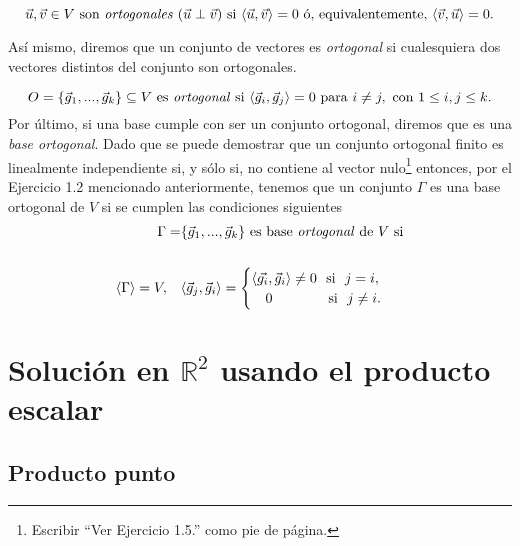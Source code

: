 \documentclass[12pt,dvipsnames]{article}
\numberwithin{equation}{section}
\begin{document}
\[
    \vec{u},\vec{v}\in V \ \text{son \emph{ortogonales}} \ (\vec{u}\perp\vec{v}) \ \text{si} \ \langle \vec{u} , \vec{v} \rangle = 0 \ \text{ó, equivalentemente,} \ \langle \vec{v} , \vec{u} \rangle = 0.
\] 

\noindent Así mismo, diremos que un conjunto de vectores es \emph{ortogonal} si cualesquiera dos vectores distintos del conjunto son ortogonales.

\[
    O=\{\vec{g}_1,...,\vec{g}_k\}\subseteq V \ \text{es \emph{ortogonal} si} \ \langle \vec{g}_i , \vec{g}_j \rangle = 0 \ \text{para} \ i\neq j, \ \text{con} \ 1\le i,j\le k.
\]
\noindent Por último, si una base cumple con ser un conjunto ortogonal, diremos que es una \emph{base ortogonal}. Dado que se puede demostrar que un conjunto ortogonal finito es linealmente independiente si, y sólo si, no contiene al vector nulo\footnote{Escribir ``Ver Ejercicio 1.5.'' como pie de página.} entonces, por el Ejercicio 1.2 mencionado anteriormente, tenemos que un conjunto $\Gamma$ es una base ortogonal de $V$ si se cumplen las condiciones siguientes
\begin{align*}
    \Gamma=&\{\vec{g}_1,...,\vec{g}_k\} \text{ es base \emph{ortogonal} de } V \text{ si}\\
    \\
\langle\Gamma\rangle = V, \quad &\langle \vec{g}_j , \vec{g}_i \rangle = \begin{cases} \langle\vec{g_i}, \vec{g}_i\rangle\neq0 \ \ \text{si} \ \ j = i, \\ \quad 0 \quad \ \ \ \ \ \ \ \ \ \text{si} \ \ j\neq i. \end{cases}\\
\end{align*}


\section{Solución en $\mathbb{R}^2$ usando el producto escalar}

\subsection{Producto punto}
\end{document}
